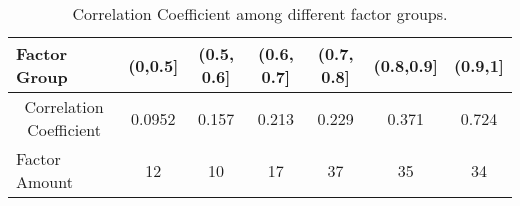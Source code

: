 \begin{table}[h]
	\centering
		\caption{Correlation Coefficient among different factor groups. }
			\label{table:Correlation}
	\begin{tabular}{l|cccccc}
		\hline
		\hline
		Factor Group                                 & (0,0.5{]} & (0.5, 0.6{]} & (0.6, 0.7{]} & (0.7, 0.8{]} & (0.8,0.9{]} & (0.9,1{]} \\ \hline
		\multicolumn{1}{c|}{Correlation Coefficient} & 0.0952    & 0.157        & 0.213        & 0.229        & 0.371       & 0.724   \\
		Factor Amount &12 & 10 &  17 & 37& 35 &34  \\ \hline \hline
	\end{tabular}
\end{table}